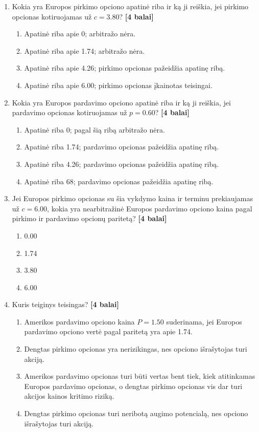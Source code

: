 \documentclass[11pt]{article}
\newcommand{\pts}[1]{\hspace{0.35em}\textnormal{\textbf{[#1 balai]}}}
\newenvironment{choices}{\begin{enumerate}[label=\Alph*.,leftmargin=2.2em,itemsep=0.12em,topsep=0.12em]}{\end{enumerate}}
\begin{document}
\begin{enumerate}
    \item Kokia yra Europos pirkimo opciono apatinė riba ir ką ji reiškia, jei
    pirkimo opcionas kotiruojamas už $c=3.80$? \pts{4}
    \begin{choices}
        \item Apatinė riba apie 0; arbitražo nėra.
        \item Apatinė riba apie 1.74; arbitražo nėra.
        \item Apatinė riba apie 4.26; pirkimo opcionas pažeidžia apatinę ribą.
        \item Apatinė riba apie 6.00; pirkimo opcionas įkainotas teisingai.
    \end{choices}

    \item Kokia yra Europos pardavimo opciono apatinė riba ir ką ji reiškia, jei
    pardavimo opcionas kotiruojamas už $p=0.60$? \pts{4}
    \begin{choices}
        \item Apatinė riba 0; pagal šią ribą arbitražo nėra.
        \item Apatinė riba 1.74; pardavimo opcionas pažeidžia apatinę ribą.
        \item Apatinė riba 4.26; pardavimo opcionas pažeidžia apatinę ribą.
        \item Apatinė riba 68; pardavimo opcionas pažeidžia apatinę ribą.
    \end{choices}

    \item Jei Europos pirkimo opcionas su šia vykdymo kaina ir terminu
    prekiaujamas už $c=6.00$, kokia yra nearbitražinė Europos pardavimo opciono
    kaina pagal pirkimo ir pardavimo opcionų paritetą? \pts{4}
    \begin{choices}
        \item 0.00
        \item 1.74
        \item 3.80
        \item 6.00
    \end{choices}

    \item Kuris teiginys teisingas? \pts{4}
    \begin{choices}
        \item Amerikos pardavimo opciono kaina $P=1.50$ suderinama, jei Europos
        pardavimo opciono vertė pagal paritetą yra apie 1.74.
        \item Dengtas pirkimo opcionas yra nerizikingas, nes opciono išrašytojas turi akciją.
        \item Amerikos pardavimo opcionas turi būti vertas bent tiek, kiek
        atitinkamas Europos pardavimo opcionas, o dengtas pirkimo opcionas vis
        dar turi akcijos kainos kritimo riziką.
        \item Dengtas pirkimo opcionas turi neribotą augimo potencialą, nes
        opciono išrašytojas turi akciją.
    \end{choices}
\end{enumerate}
\end{document}
